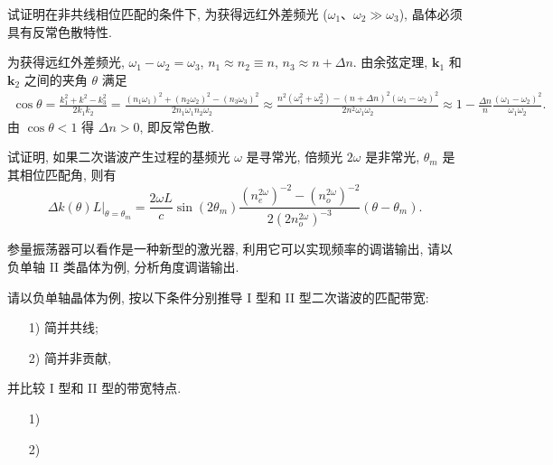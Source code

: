 \documentclass{assignment}
\begin{document}
\begin{prob}
    试证明在非共线相位匹配的条件下, 为获得远红外差频光 ($\omega_1$、$\omega_2\gg\omega_3$), 晶体必须具有反常色散特性.
\end{prob}
\begin{pf}
    为获得远红外差频光, $\omega_1-\omega_2=\omega_3$, $n_1\approx n_2\equiv n$, $n_3\approx n+\Delta n$. 由余弦定理, $\bm{k}_1$ 和 $\bm{k}_2$ 之间的夹角 $\theta$ 满足
    \begin{align}
        \cos\theta=\frac{k_1^2+k^2-k_3^2}{2k_1k_2}=\frac{(n_1\omega_1)^2+(n_2\omega_2)^2-(n_3\omega_3)^2}{2n_1\omega_1n_2\omega_2}\approx\frac{n^2(\omega_1^2+\omega_2^2)-(n+\Delta n)^2(\omega_1-\omega_2)^2}{2n^2\omega_1\omega_2}\approx 1-\frac{\Delta n}{n}\frac{(\omega_1-\omega_2)^2}{\omega_1\omega_2}.
    \end{align}
    由 $\cos\theta<1$ 得 $\Delta n>0$, 即反常色散.
\end{pf}

\begin{prob}
    试证明, 如果二次谐波产生过程的基频光 $\omega$ 是寻常光, 倍频光 $2\omega$ 是非常光, $\theta_m$ 是其相位匹配角, 则有
    \[
        \Delta k(\theta)L|_{\theta=\theta_m}=\frac{2\omega L}{c}\sin(2\theta_m)\frac{(n_e^{2\omega})^{-2}-(n_o^{2\omega})^{-2}}{2(2n_o^{2\omega})^{-3}}(\theta-\theta_m).
    \]
\end{prob}
\begin{pf}
    
\end{pf}

\begin{prob}
    参量振荡器可以看作是一种新型的激光器, 利用它可以实现频率的调谐输出, 请以负单轴 II 类晶体为例, 分析角度调谐输出.
\end{prob}
\begin{sol}
    
\end{sol}

\begin{prob}
    请以负单轴晶体为例, 按以下条件分别推导 I 型和 II 型二次谐波的匹配带宽:
    \begin{itemize}
        \item[1)] 简并共线;
        \item[2)] 简并非贡献,
    \end{itemize}
    并比较 I 型和 II 型的带宽特点.
\end{prob}
\begin{pf}
    \begin{itemize}
        \item[1)] 
        \item[2)] 
    \end{itemize}
\end{pf}
\end{document}

